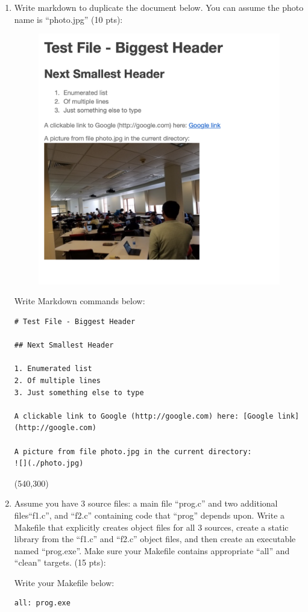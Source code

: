 \documentclass[10pt]{article}
\begin{document}
\begin{enumerate}
\item Write markdown to duplicate the document below. You can assume the photo name is ``photo.jpg'' (10 pts):
\begin{figure}[h]
\centering
\includegraphics[width=0.6\linewidth]{./test_markdown}
\label{fig:testmarkdown}
\end{figure}

\bigskip
Write Markdown commands below:

\beginanswers

\begin{lstlisting}
# Test File - Biggest Header

## Next Smallest Header

1. Enumerated list
2. Of multiple lines
3. Just something else to type

A clickable link to Google (http://google.com) here: [Google link](http://google.com)

A picture from file photo.jpg in the current directory:
![](./photo.jpg)
\end{lstlisting}
\else
\hspace*{-0.4in}\framebox(540,300){}
\fi
\newpage

\item Assume you have 3 source files: a main file ``prog.c'' and two additional files``f1.c'', and ``f2.c'' containing code that ``prog'' depends upon. Write a Makefile that explicitly creates object files for all 3 sources, create a static library from the ``f1.c'' and ``f2.c'' object files, and then create an executable named ``prog.exe''. Make sure your Makefile contains appropriate ``all'' and ``clean'' targets. (15 pts):
\bigskip

Write your Makefile below:
\beginanswers
\begin{lstlisting}
all: prog.exe


\end{lstlisting}
\end{enumerate}
\end{document}
